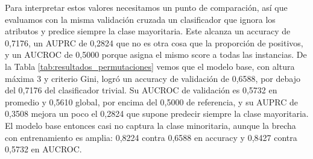 \documentclass[10pt,a4paper]{article}
\begin{document}
\begin{table}[H]
\centering
{}
\caption{Métricas de un árbol de altura máxima 3 con criterio Gini, por fold de la validación cruzada estratificada de 5 particiones sobre el conjunto de desarrollo. Global se calcula sobre las predicciones acumuladas de los 5 folds de validación.}
\label{tab:resultados_permutaciones}
\end{table}

Para interpretar estos valores necesitamos un punto de comparación, así que evaluamos con la misma validación cruzada un clasificador que ignora los atributos y predice siempre la clase mayoritaria. Este alcanza un accuracy de 0,7176, un AUPRC de 0,2824 que no es otra cosa que la proporción de positivos, y un AUCROC de 0,5000 porque asigna el mismo score a todas las instancias.
De la Tabla \ref{tab:resultados_permutaciones} vemos que el modelo base, con altura máxima 3 y criterio Gini, logró un accuracy de validación de 0,6588, por debajo del 0,7176 del clasificador trivial. Su AUCROC de validación es 0,5732 en promedio y 0,5610 global, por encima del 0,5000 de referencia, y su AUPRC de 0,3508 mejora un poco el 0,2824 que supone predecir siempre la clase mayoritaria. El modelo base entonces casi no captura la clase minoritaria, aunque la brecha con entrenamiento es amplia: 0,8224 contra 0,6588 en accuracy y 0,8427 contra 0,5732 en AUCROC.
\end{document}
